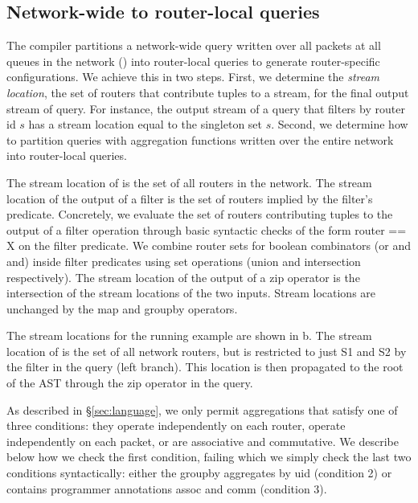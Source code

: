 \subsection{Network-wide to router-local queries}
\label{sec:network-to-router-local}

The compiler partitions a network-wide query written over all packets at all
queues in the network () into router-local queries to generate
router-specific configurations. We achieve this in two steps. First, we
determine the {\em stream location}, \ie the set of routers that contribute
tuples to a stream, for the final output stream of query. For instance, the
output stream of a query that filters by router id $s$ has a stream location
equal to the singleton set $s$. Second, we determine how to partition queries
with aggregation functions written over the entire network into router-local
queries.


 The stream
location of {\ct \pktlog} is the set of all routers in the network. The stream
location of the output of a {\ct filter} is the set of routers implied by the
filter's predicate. Concretely, we evaluate the set of routers contributing
tuples to the output of a {\ct filter} operation through basic syntactic checks
of the form {\ct router == X} on the {\ct filter} predicate.  We combine router
sets for boolean combinators ({\ct or} and {\ct and}) inside filter predicates
using set operations (union and intersection respectively). The stream location
of the output
of a {\ct zip} operator is the intersection of the stream locations of the two
inputs.  Stream locations are unchanged by the {\ct map} and {\ct groupby}
operators.

The stream locations for the running example are shown in
b. The stream location of {\ct \pktlog} is
the set of all network routers, but is restricted to just {\ct S1} and {\ct
S2} by the {\ct filter} in the query (left branch). This location is then propagated
to the root of the AST through the {\ct zip} operator in the query.

As described in \S\ref{sec:language}, we only permit aggregations that satisfy
one of three conditions: they operate independently on each router, operate
independently on each packet, or are associative and commutative.
We describe below how we
check the first condition, failing which we simply check the last two
conditions syntactically: either the {\ct groupby} aggregates by {\ct uid}
(condition 2) or contains programmer annotations {\ct assoc} and {\ct comm}
(condition 3).

